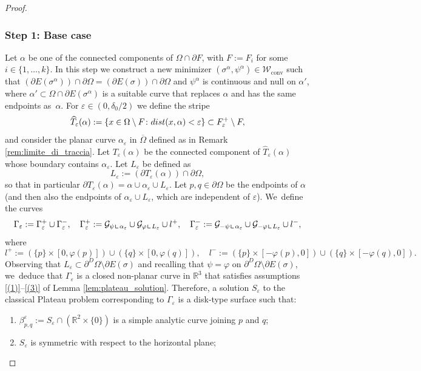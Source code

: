 \documentclass[11pt]{article}
\numberwithin{equation}{section}
\newcommand{\R}{\mathbb{R}}
\let\eps\varepsilon
\let\Om\Omega
\newcommand\admclassconv{{\mathcal W_\mathrm{conv}}}
\newcommand{\dist}{\textup{dist}}
\newcommand{\resa}{\mathop{\hbox{\vrule height 7pt width 0.5pt depth 0pt
\vrule height 0.5pt width 6pt depth 0pt}}\nolimits}
\newcommand{\resb}{\mathop{\hbox{\vrule height 4pt width 0.5pt depth 0pt
\vrule height 0.5pt width 3pt depth 0pt}}\nolimits}
\newcommand{\res}{\mathchoice{\resa}{\resa}{\resb}{\resb}}
\theoremstyle{definition}
\begin{document}
\begin{proof}
\subsubsection*{Step 1: Base case} Let $\alpha$ be one of the connected components of $\Om\cap\partial F$, with $F:=F_i$ for some $i\in\{1,\dots,k\}$.
In this step we construct a new minimizer $(\sigma^\alpha,\psi^\alpha)\in\admclassconv$ such that $(\partial E(\sigma^\alpha))\cap\partial\Om=(\partial E(\sigma))\cap\partial\Om$
and
$\psi^\alpha$ is continuous and null on $\alpha'$, where
$\alpha'\subset\Om\cap\partial E(\sigma^\alpha)$ is a suitable curve that replaces $\alpha$ and has the same endpoints as~$\alpha$.
For $\eps\in(0,\delta_0/2)$ we define the stripe
\[
\widehat T_\eps(\alpha):=\{x\in\Om\setminus F\colon\dist(x,\alpha)<\eps\}\subset F^+_\eps\setminus F,
\]
and consider the planar curve $\alpha_\eps$ in $\overline\Om$ defined as in Remark \ref{rem:limite_di_traccia}.
Let $T_\eps(\alpha)$ be the connected component of $\widehat T_\eps(\alpha)$ whose boundary contains $\alpha_\eps$. Let $L_\eps$ be defined as
\[
 L_\eps:=(\partial T_\eps(\alpha))\cap \partial\Om,
\]
so that in particular
$\partial T_\eps(\alpha)=\alpha\cup\alpha_\eps\cup L_\eps $.
Let $p,q\in \partial\Om$ be the endpoints of $\alpha$ (and then also the endpoints of $\alpha_\eps\cup L_\eps$, which are independent of $\eps$). We~define the curves
\[
\Gamma_\eps:=\Gamma_\eps^+\cup\Gamma_\eps^-,\quad
\Gamma_\eps^+:=\mathcal{G}_{\psi\res\alpha_\eps}\cup \mathcal{G}_{\varphi\res L_\eps}\cup l^+,\quad \Gamma_\eps^-:=\mathcal{G}_{-\psi\res\alpha_\eps}\cup \mathcal{G}_{-\varphi\res L_\eps}\cup l^-,
\]
where
\begin{equation*}
l^+:=(\{p\}\times[0,\varphi(p)])\cup (\{q\}\times[0,\varphi(q)]),\quad
l^-:=(\{p\}\times[-\varphi(p),0])\cup(\{q\}\times[-\varphi(q),0]).
\end{equation*}
Observing that $L_\eps\subset\partial^D\Om\setminus\partial E(\sigma)$ and recalling that $\psi=\varphi$ on $\partial^D\Om\setminus\partial E(\sigma)$, we~deduce that
$\Gamma_\eps$ is a closed non-planar curve in $\R^3$ that satisfies assumptions \ref{(1)}--\ref{(3)} of Lemma \ref{lem:plateau_solution}.
Therefore, a solution $S_\eps$ to the classical Plateau problem corresponding to $\Gamma_\eps$ is a disk-type surface such that:
\begin{enumerate}[{\rm (1)},wide]
\item $\beta_{p,q}^\eps:=S_\eps\cap(\R^2\times\{0\})$ is a simple analytic curve joining $p$ and $q$;
\item $S_\eps$ is symmetric with respect to the horizontal plane;

\end{enumerate}
\end{proof}
\end{document}

